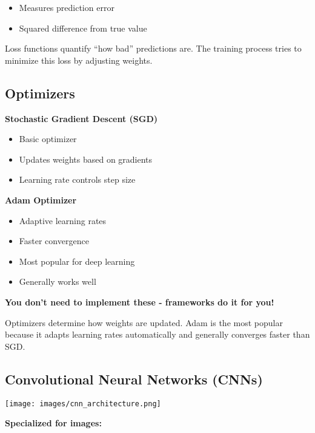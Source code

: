 \documentclass[
  letterpaper,
  DIV=11,
  numbers=noendperiod]{scrartcl}
\providecommand{\tightlist}{%
  \setlength{\itemsep}{0pt}\setlength{\parskip}{0pt}}
\begin{document}
\begin{itemize}
\tightlist
\item
  Measures prediction error
\item
  Squared difference from true value
\end{itemize}

Loss functions quantify ``how bad'' predictions are. The training
process tries to minimize this loss by adjusting weights.

\subsection{Optimizers}\label{optimizers}

\textbf{Stochastic Gradient Descent (SGD)}

\begin{itemize}
\tightlist
\item
  Basic optimizer
\item
  Updates weights based on gradients
\item
  Learning rate controls step size
\end{itemize}

\textbf{Adam Optimizer}

\begin{itemize}
\tightlist
\item
  Adaptive learning rates
\item
  Faster convergence
\item
  Most popular for deep learning
\item
  Generally works well
\end{itemize}

\textbf{You don't need to implement these - frameworks do it for you!}

Optimizers determine how weights are updated. Adam is the most popular
because it adapts learning rates automatically and generally converges
faster than SGD.

\subsection{Convolutional Neural Networks
(CNNs)}\label{convolutional-neural-networks-cnns}

\begin{center}
\texttt{[image: images/cnn\_architecture.png]}
\end{center}

\textbf{Specialized for images:}
\end{document}
